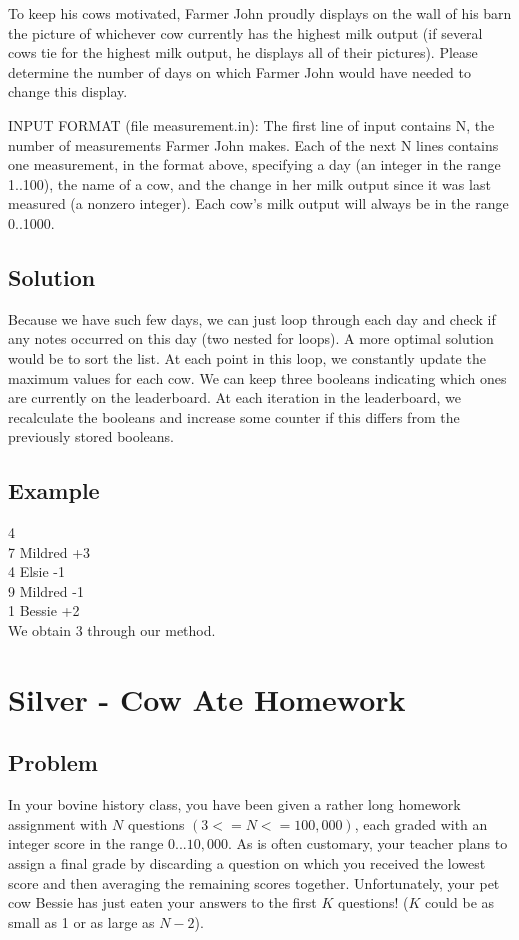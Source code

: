 \documentclass[11pt]{article}
\begin{document}
            To keep his cows motivated, Farmer John proudly displays on the wall of his barn the picture of whichever cow currently has the highest milk output (if several cows tie for the highest milk output, he displays all of their pictures). Please determine the number of days on which Farmer John would have needed to change this display.
            
            INPUT FORMAT (file measurement.in):
            The first line of input contains N, the number of measurements Farmer John makes. Each of the next N lines contains one measurement, in the format above, specifying a day (an integer in the range 1..100), the name of a cow, and the change in her milk output since it was last measured (a nonzero integer). Each cow's milk output will always be in the range 0..1000.
            
        \subsection{Solution}
            Because we have such few days, we can just loop through each day and check if any notes occurred on this day (two nested for loops). A more optimal solution would be to sort the list. At each point in this loop, we constantly update the maximum values for each cow. We can keep three booleans indicating which ones are currently on the leaderboard. At each iteration in the leaderboard, we recalculate the booleans and increase some counter if this differs from the previously stored booleans.
        
        \subsection{Example}
            4 \\
            7 Mildred +3 \\
            4 Elsie -1 \\ 
            9 Mildred -1 \\
            1 Bessie +2 \\
            
            We obtain 3 through our method.

\section{Silver - Cow Ate Homework}
    \subsection{Problem}
    In your bovine history class, you have been given a rather long homework assignment with $N$ questions $(3<=N<=100,000)$, each graded with an integer score in the range $0...10,000$. As is often customary, your teacher plans to assign a final grade by discarding a question on which you received the lowest score and then averaging the remaining scores together. Unfortunately, your pet cow Bessie has just eaten your answers to the first $K$ questions! ($K$ could be as small as 1 or as large as $N−2$).
    
\end{document}
